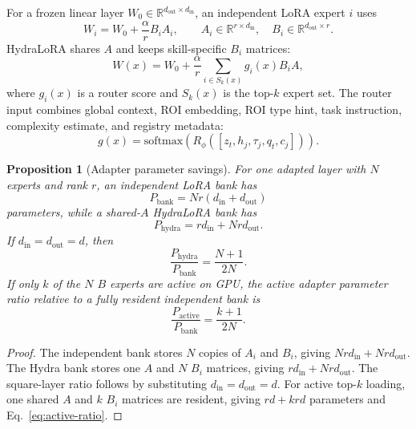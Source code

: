 \documentclass[11pt]{article}
\newtheorem{proposition}{Proposition}
\begin{document}
For a frozen linear layer $W_0\in\mathbb{R}^{d_{\mathrm{out}}\times d_{\mathrm{in}}}$, an independent LoRA expert $i$ uses
\begin{equation}
  W_i = W_0 + \frac{\alpha}{r}B_iA_i,
  \qquad
  A_i\in\mathbb{R}^{r\times d_{\mathrm{in}}},
  \quad
  B_i\in\mathbb{R}^{d_{\mathrm{out}}\times r}.
\end{equation}
HydraLoRA shares $A$ and keeps skill-specific $B_i$ matrices:
\begin{equation}
  W(x)=W_0+\frac{\alpha}{r}\sum_{i\in S_k(x)}g_i(x)B_iA,
  \label{eq:hydra}
\end{equation}
where $g_i(x)$ is a router score and $S_k(x)$ is the top-$k$ expert set.
The router input combines global context, ROI embedding, ROI type hint, task instruction, complexity estimate, and registry metadata:
\begin{equation}
  g(x)=\mathrm{softmax}\left(R_\phi([z_t,h_j,\tau_j,q_t,c_j])\right).
\end{equation}

\begin{proposition}[Adapter parameter savings]
For one adapted layer with $N$ experts and rank $r$, an independent LoRA bank has
\begin{equation}
  P_{\mathrm{bank}} = N r(d_{\mathrm{in}}+d_{\mathrm{out}})
\end{equation}
parameters, while a shared-$A$ HydraLoRA bank has
\begin{equation}
  P_{\mathrm{hydra}} = r d_{\mathrm{in}} + N r d_{\mathrm{out}}.
\end{equation}
If $d_{\mathrm{in}}=d_{\mathrm{out}}=d$, then
\begin{equation}
  \frac{P_{\mathrm{hydra}}}{P_{\mathrm{bank}}}=\frac{N+1}{2N}.
  \label{eq:hydra-ratio}
\end{equation}
If only $k$ of the $N$ $B$ experts are active on GPU, the active adapter parameter ratio relative to a fully resident independent bank is
\begin{equation}
  \frac{P_{\mathrm{active}}}{P_{\mathrm{bank}}}=\frac{k+1}{2N}.
  \label{eq:active-ratio}
\end{equation}
\end{proposition}

\begin{proof}
The independent bank stores $N$ copies of $A_i$ and $B_i$, giving $Nr d_{\mathrm{in}}+Nr d_{\mathrm{out}}$.
The Hydra bank stores one $A$ and $N$ $B_i$ matrices, giving $rd_{\mathrm{in}}+Nr d_{\mathrm{out}}$.
The square-layer ratio follows by substituting $d_{\mathrm{in}}=d_{\mathrm{out}}=d$.
For active top-$k$ loading, one shared $A$ and $k$ $B_i$ matrices are resident, giving $rd+krd$ parameters and Eq.~\ref{eq:active-ratio}.
\end{proof}
\end{document}
